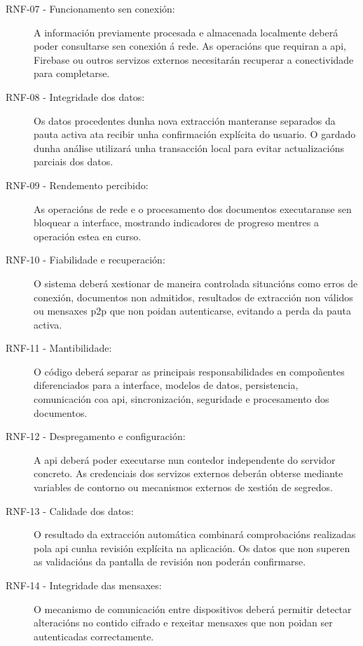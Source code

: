 \begin{description}
\item[RNF-07 - Funcionamento sen conexión:] A información previamente procesada e almacenada localmente deberá poder consultarse sen conexión á rede. As operacións que requiran a \gls{api}, Firebase ou outros servizos externos necesitarán recuperar a conectividade para completarse.

\item[RNF-08 - Integridade dos datos:] Os datos procedentes dunha nova extracción manteranse separados da pauta activa ata recibir unha confirmación explícita do usuario. O gardado dunha análise utilizará unha transacción local para evitar actualizacións parciais dos datos.

\item[RNF-09 - Rendemento percibido:] As operacións de rede e o procesamento dos documentos executaranse sen bloquear a interface, mostrando indicadores de progreso mentres a operación estea en curso.

\item[RNF-10 - Fiabilidade e recuperación:] O sistema deberá xestionar de maneira controlada situacións como erros de conexión, documentos non admitidos, resultados de extracción non válidos ou mensaxes \gls{p2p} que non poidan autenticarse, evitando a perda da pauta activa.

\item[RNF-11 - Mantibilidade:] O código deberá separar as principais responsabilidades en compoñentes diferenciados para a interface, modelos de datos, persistencia, comunicación coa \gls{api}, sincronización, seguridade e procesamento dos documentos.

\item[RNF-12 - Despregamento e configuración:] A \gls{api} deberá poder executarse nun contedor independente do servidor concreto. As credenciais dos servizos externos deberán obterse mediante variables de contorno ou mecanismos externos de xestión de segredos.

\item[RNF-13 - Calidade dos datos:] O resultado da extracción automática combinará comprobacións realizadas pola \gls{api} cunha revisión explícita na aplicación. Os datos que non superen as validacións da pantalla de revisión non poderán confirmarse.

\item[RNF-14 - Integridade das mensaxes:] O mecanismo de comunicación entre dispositivos deberá permitir detectar alteracións no contido cifrado e rexeitar mensaxes que non poidan ser autenticadas correctamente.


\end{description}

